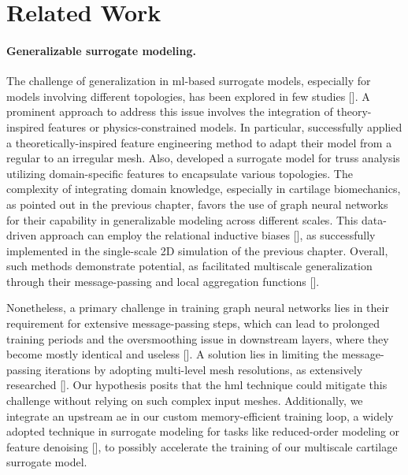 \documentclass[12pt,a4paper]{report}
\begin{document}
\section{Related Work}
%
\paragraph{Generalizable surrogate modeling.} The challenge of generalization in \ac{ml}-based surrogate models, especially for models involving different topologies, has been explored in few studies [\cite{hoffer2022,taghizadeh2020}]. A prominent approach to address this issue involves the integration of theory-inspired features or physics-constrained models. In particular, \cite{gao2021} successfully applied a theoretically-inspired feature engineering method to adapt their model from a regular to an irregular mesh. Also, \cite{nourbakhsh2018} developed a surrogate model for truss analysis utilizing domain-specific features to encapsulate various topologies. The complexity of integrating domain knowledge, especially in cartilage biomechanics, as pointed out in the previous chapter, favors the use of graph neural networks for their capability in generalizable modeling across different scales. This data-driven approach can employ the relational inductive biases [\cite{battaglia2018}], as successfully implemented in the single-scale 2D simulation of the previous chapter. Overall, such methods demonstrate potential, as facilitated multiscale generalization through their message-passing and local aggregation functions [\cite{battaglia2018,sanchez2020}].

Nonetheless, a primary challenge in training graph neural networks lies in their requirement for extensive message-passing steps, which can lead to prolonged training periods and the oversmoothing issue in downstream layers, where they become mostly identical and useless [\cite{zhang2024}]. A solution lies in limiting the message-passing iterations by adopting multi-level mesh resolutions, as extensively researched [\cite{cao2023,fortunato2022,li2020}]. Our hypothesis posits that the \ac{hml} technique could mitigate this challenge without relying on such complex input meshes. Additionally, we integrate an upstream \ac{ae} in our custom memory-efficient training loop, a widely adopted technique in surrogate modeling for tasks like reduced-order modeling or feature denoising [\cite{fresca2022,pant2021,fresca2021}], to possibly accelerate the training of our multiscale cartilage surrogate model.
\end{document}
